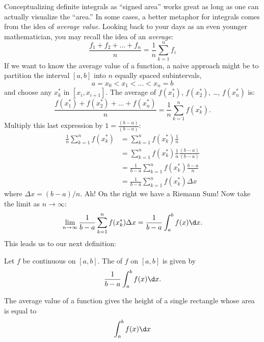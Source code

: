 \documentclass{ximera}
\begin{document}
Conceptualizing definite integrals as ``signed area'' works great as
long as one can actually visualize the ``area.'' In some cases, a
better metaphor for integrals comes from the idea of \textit{average
  value}.  Looking back to your days as an even younger mathematician,
you may recall the idea of an \textit{average}:
\[
\frac{f_1+f_2+\dots+f_n}{n} = \frac{1}{n}\sum_{k=1}^n f_i
\]
If we want to know the average value of a function, a naive approach
might be to partition the interval $[a,b]$ into $n$ equally spaced
subintervals, 
\[
a=x_0 < x_1 < \dots < x_{n}=b
\]
and choose any $x_k^*$ in $[x_i,x_{i+1}]$. The average of $f(x_1^*)$,
$f(x_2^*)$, \dots, $f(x_n^*)$ is:
\[
\frac{f(x_1^*) + f(x_2^*) + \dots + f(x_n^*)}{n} = \frac1n\sum_{k=1}^n f(x_k^*).
\]
Multiply this last expression by $1 = \frac{(b-a)}{(b-a)}$:
\begin{align*}
  \frac1n\sum_{k=1}^n f(x_k^*) &= \sum_{k=1}^n f(x_k^*)\frac1n \\
  &= \sum_{k=1}^n f(x_k^*)\frac1n \frac{(b-a)}{(b-a)} \\
  &= \frac{1}{b-a} \sum_{k=1}^n f(x_k^*)\frac{b-a}n  \\
  &=\frac{1}{b-a} \sum_{k=1}^n f(x_k^*)\Delta x
\end{align*}
where $\Delta x = (b-a)/n$.  Ah! On the right we have a Riemann Sum!
Now take the limit as $n\to\infty$:
\[
\lim_{n\to\infty} \frac{1}{b-a} \sum_{k=1}^n f(x_k^*)\Delta x = \frac{1}{b-a} \int_a^b f(x)\d x.
\]
This leads us to our next definition:

\begin{definition}
  Let $f$ be continuous on $[a,b]$. The  of $f$ on
  $[a,b]$ is given by
  \[
  \frac{1}{b-a}\int_a^b f(x)\d x.
  \]
\end{definition}

The average value of a function gives the height of a single rectangle whose area is equal to
\[
\int_a^b f(x) \d x
\]
\begin{image}
\end{image}
\end{document}
